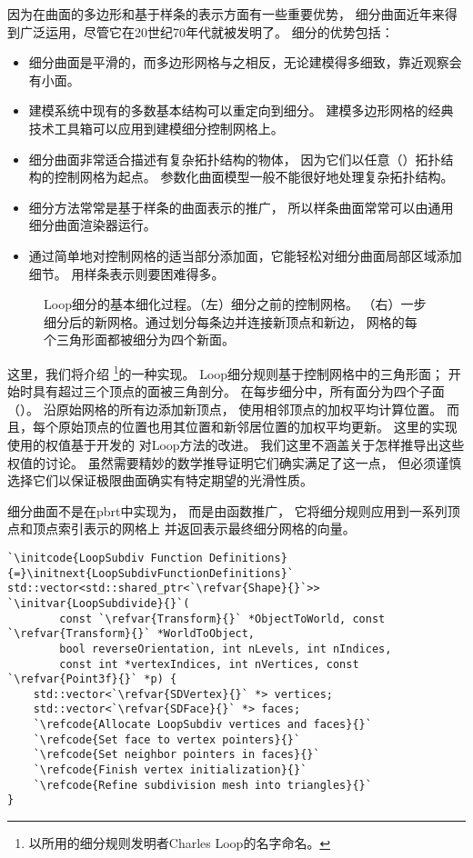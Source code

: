因为在曲面的多边形和基于样条的表示方面有一些重要优势，
细分曲面近年来得到广泛运用，尽管它在20世纪70年代就被发明了。
细分的优势包括：
\begin{itemize}
    \item 细分曲面是平滑的，而多边形网格与之相反，无论建模得多细致，靠近观察会有小面。
    \item 建模系统中现有的多数基本结构可以重定向到细分。
          建模多边形网格的经典技术工具箱可以应用到建模细分控制网格上。
    \item 细分曲面非常适合描述有复杂拓扑结构的物体，
          因为它们以任意（）拓扑结构的控制网格为起点。
          参数化曲面模型一般不能很好地处理复杂拓扑结构。
    \item 细分方法常常是基于样条的曲面表示的推广，
          所以样条曲面常常可以由通用细分曲面渲染器运行。
    \item 通过简单地对控制网格的适当部分添加面，它能轻松对细分曲面局部区域添加细节。
          用样条表示则要困难得多。
\end{itemize}
\begin{figure}[htbp]
    \centering
    \caption{Loop细分的基本细化过程。（左）细分之前的控制网格。
        （右）一步细分后的新网格。通过划分每条边并连接新顶点和新边，
        网格的每个三角形面都被细分为四个新面。}
    \label{fig:3.26}
\end{figure}

这里，我们将介绍
\footnote{以所用的细分规则发明者Charles Loop的名字命名。}的一种实现。
Loop细分规则基于控制网格中的三角形面；
开始时具有超过三个顶点的面被三角剖分。
在每步细分中，所有面分为四个子面（）。
沿原始网格的所有边添加新顶点，
使用相邻顶点的加权平均计算位置。
而且，每个原始顶点的位置也用其位置和新邻居位置的加权平均更新。
这里的实现使用的权值基于\citet{10.1145/192161.192233}开发的
对Loop方法的改进。
我们这里不涵盖关于怎样推导出这些权值的讨论。
虽然需要精妙的数学推导证明它们确实满足了这一点，
但必须谨慎选择它们以保证极限曲面确实有特定期望的光滑性质。

细分曲面不是在pbrt中实现为，
而是由函数推广，
它将细分规则应用到一系列顶点和顶点索引表示的网格上
并返回表示最终细分网格的向量。
\begin{lstlisting}
`\initcode{LoopSubdiv Function Definitions}{=}\initnext{LoopSubdivFunctionDefinitions}`
std::vector<std::shared_ptr<`\refvar{Shape}{}`>> `\initvar{LoopSubdivide}{}`(
        const `\refvar{Transform}{}` *ObjectToWorld, const `\refvar{Transform}{}` *WorldToObject,
        bool reverseOrientation, int nLevels, int nIndices,
        const int *vertexIndices, int nVertices, const `\refvar{Point3f}{}` *p) {
    std::vector<`\refvar{SDVertex}{}` *> vertices;
    std::vector<`\refvar{SDFace}{}` *> faces;
    `\refcode{Allocate LoopSubdiv vertices and faces}{}`
    `\refcode{Set face to vertex pointers}{}`
    `\refcode{Set neighbor pointers in faces}{}`
    `\refcode{Finish vertex initialization}{}`
    `\refcode{Refine subdivision mesh into triangles}{}`
}
\end{lstlisting}

